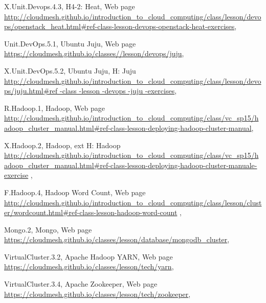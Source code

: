 X.Unit.Devops.4.3, H4-2: Heat, Web page \url{http://cloudmesh.github.io/introduction_to_cloud_computing/class/lesson/devops/openstack_heat.html#ref-class-lesson-devops-openstack-heat-exercises}, 

Unit.DevOps.5.1, Ubuntu Juju, Web page \url{https://cloudmesh.github.io/classes//lesson/devops/juju}, 

X.Unit.DevOps.5.2, Ubuntu Juju, H: Juju  \url{http://cloudmesh.github.io/introduction_to_cloud_computing/class/lesson/devops/juju.html#ref -class -lesson -devops -juju -exercises}, 

R.Hadoop.1, Hadoop, Web page \url{http://cloudmesh.github.io/introduction_to_cloud_computing/class/vc_sp15/hadoop_cluster_manual.html#ref-class-lesson-deploying-hadoop-cluster-manual}, 

X.Hadoop.2, Hadoop, ext H: Hadoop \url{http://cloudmesh.github.io/introduction_to_cloud_computing/class/vc_sp15/hadoop_cluster_manual.html#ref-class-lesson-deploying-hadoop-cluster-manuale-exercise}  , 


F.Hadoop.4, Hadoop Word Count, Web page \url{http://cloudmesh.github.io/introduction_to_cloud_computing/class/lesson/cluster/wordcount.html#ref-class-lesson-hadoop-word-count}  , 


Mongo.2, Mongo, Web page \url{https://cloudmesh.github.io/classes/lesson/database/mongodb_cluster}, 




VirtualCluster.3.2, Apache Hadoop YARN, Web page \url{https://cloudmesh.github.io/classes/lesson/tech/yarn},   


VirtualCluster.3.4, Apache Zookeeper, Web page \url{https://cloudmesh.github.io/classes/lesson/tech/zookeeper}, 

